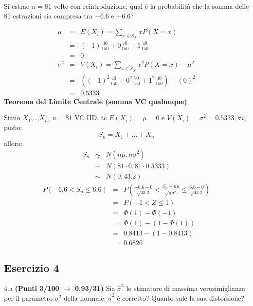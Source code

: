 \documentclass[
  11pt,
]{book}
\theoremstyle{mytheoremstyle}
\theoremstyle{mydefstyle}
\newenvironment{sol}
  {
  \begin{tcolorbox}[enhanced,breakable,arc=0.1mm,boxrule=1pt,colback=white,colframe=iblue,
  title=\bf \fontfamily{lmss}\selectfont \hspace{.5 cm} Soluzione,drop fuzzy shadow]

}{
\end{tcolorbox}
  }
\begin{document}
Si estrae \(n=81\) volte con reintroduzione, qual è la probabilità che la somma delle 81 estrazioni sia compresa tra
\(-6.6\) e \(+6.6\)?

\begin{sol}
\begin{eqnarray*} \mu &=& E(X_i) = \sum_{x\in S_X}x P(X=x)\\ 
 &=& ( -1 ) \frac { 40 }{ 150 }+ 0  \frac { 70 }{ 150 }+ 1  \frac { 40 }{ 150 } \\ 
            &=& 0 \\ 
 \sigma^2 &=& V(X_i) = \sum_{x\in S_X}x^2 P(X=x)-\mu^2\\ 
 &=&\left( ( -1 ) ^2\frac { 40 }{ 150 }+ 0  ^2\frac { 70 }{ 150 }+ 1  ^2\frac { 40 }{ 150 } \right)-( 0 )^2\\ 
            &=& 0.5333 
\end{eqnarray*}
\textbf{Teorema del Limite Centrale (somma VC qualunque)}

Siano \(X_1\),\ldots,\(X_n\), \(n=81\) VC IID, tc \(E(X_i)=\mu=0\) e \(V(X_i)=\sigma^2=0.5333,\forall i\), posto:
\[
      S_n = X_1 + ... + X_n
      \]
allora:\begin{eqnarray*}
  S_n & \mathop{\sim}\limits_{a}& N(n\mu,n\sigma^2) \\
     &\sim & N(81\cdot0,81\cdot0.5333) \\
     &\sim & N(0,43.2) 
  \end{eqnarray*}\begin{eqnarray*}
   P( -6.6 < S_n \leq  6.6 ) &=& P\left( \frac { -6.6  -  0 }{\sqrt{ 43.2 }} < \frac { S_n  -  n\mu }{ \sqrt{n\sigma^2} } \leq \frac { 6.6  -  0 }{\sqrt{ 43.2 }}\right)  \\
              &=& P\left(  -1  < Z \leq  1 \right) \\
              &=& \Phi( 1 )-\Phi( -1 )\\
              &=&  \Phi( 1 )-(1-\Phi( 1 )) \\ &=&  0.8413 -(1- 0.8413 ) \\ 
              &=&  0.6826 
   \end{eqnarray*}

\end{sol}

\subsection{Esercizio 4}\label{esercizio-4-8}

4.a \textbf{(Punti 3/100 \(\rightarrow\) 0.93/31)} Sia \(\hat\sigma^2\) lo stimatore di massima verosimiglianza per il parametro \(\sigma^2\) della normale. \(\hat\sigma^2\) è corretto? Quanto vale la sua distorsione?
\end{document}
